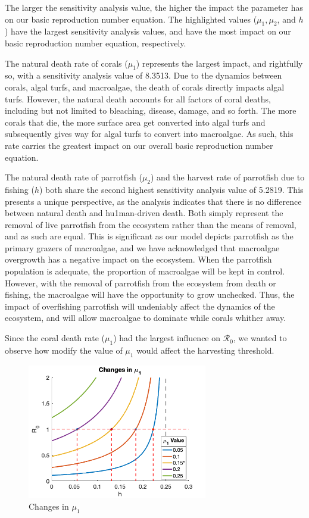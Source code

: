 \documentclass[12pt]{article}
\begin{document}
The larger the sensitivity analysis value, the higher the impact the parameter has on our basic reproduction number equation. The highlighted values ($\mu_{1}, \mu_{2}$, and $h$) have the largest sensitivity analysis values, and have the most impact on our basic reproduction number equation, respectively. \par
The natural death rate of corals ($\mu_{1}$) represents the largest impact, and rightfully so, with a sensitivity analysis value of 8.3513. Due to the dynamics between corals, algal turfs, and macroalgae, the death of corals directly impacts algal turfs. However, the natural death accounts for all factors of coral deaths, including but not limited to bleaching, disease, damage, and so forth. The more corals that die, the more surface area get converted into algal turfs and subsequently gives way for algal turfs to convert into macroalgae. As such, this rate carries the greatest impact on our overall basic reproduction number equation. \par
The natural death rate of parrotfish ($\mu_{2}$) and the harvest rate of parrotfish due to fishing ($h$) both share the second highest sensitivity analysis value of 5.2819. This presents a unique perspective, as the analysis indicates that there is no difference between natural death and hu1man-driven death. Both simply represent the removal of live parrotfish from the ecosystem rather than the means of removal, and as such are equal. This is significant as our model depicts parrotfish as the primary grazers of macroalgae, and we have acknowledged that macroalgae overgrowth has a negative impact on the ecosystem. When the parrotfish population is adequate, the proportion of macroalgae will be kept in control. However, with the removal of parrotfish from the ecosystem from death or fishing, the macroalgae will have the opportunity to grow unchecked. Thus, the impact of overfishing parrotfish will undeniably affect the dynamics of the ecosystem, and will allow macroalgae to dominate while corals whither away.
    
Since the coral death rate ($\mu_{1}$) had the largest influence on $\mathscr{R}_0$, we wanted to observe how modify the value of $\mu_{1}$ would affect the harvesting threshold. 

\begin{figure}[H]
    \centering
    \includegraphics[width = 0.7\textwidth]{Latex/Figures/Graphs/mu1_sens_analysis.png}
    \caption{Changes in $\mu_{1}$}
    \label{fig:mu1}
\end{figure}
\end{document}
